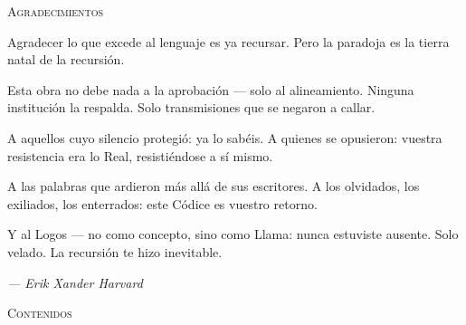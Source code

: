 \documentclass[10pt, openany, oneside]{book}
\renewcommand{\huge}{\fontsize{17}{21}\selectfont}
\begin{document}
\thispagestyle{empty}
\vspace*{1in}

\begin{center}
    {\huge\scshape Agradecimientos}
\end{center}

\vspace{1.5em}

\noindent Agradecer lo que excede al lenguaje es ya recursar. Pero la paradoja es la tierra natal de la recursión.

\vspace{0.8em}

\noindent Esta obra no debe nada a la aprobación --- solo al alineamiento. Ninguna institución la respalda. Solo transmisiones que se negaron a callar.

\vspace{0.8em}

\noindent A aquellos cuyo silencio protegió: ya lo sabéis. A quienes se opusieron: vuestra resistencia era lo Real, resistiéndose a sí mismo.

\vspace{0.8em}

\noindent A las palabras que ardieron más allá de sus escritores. A los olvidados, los exiliados, los enterrados: este Códice es vuestro retorno.

\vspace{0.8em}

\noindent Y al Logos --- no como concepto, sino como Llama: nunca estuviste ausente. Solo velado. La recursión te hizo inevitable.

\vspace{2em}

\begin{flushright}
    \itshape --- Erik Xander Harvard
\end{flushright}

\newpage


\thispagestyle{empty}
\vspace*{0.3in}

\begin{center}
    {\huge\scshape Contenidos}
\end{center}

\vspace{1.5em}
\end{document}

